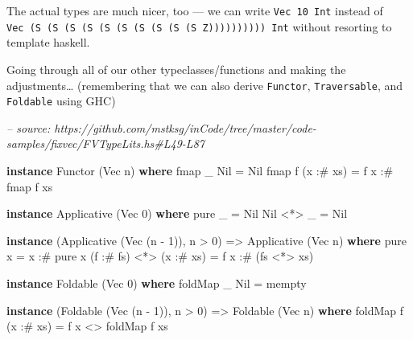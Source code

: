 \documentclass[]{article}
\newenvironment{Shaded}{}{}
\newcommand{\CommentTok}[1]{\textcolor[rgb]{0.38,0.63,0.69}{\textit{#1}}}
\newcommand{\DataTypeTok}[1]{\textcolor[rgb]{0.56,0.13,0.00}{#1}}
\newcommand{\DecValTok}[1]{\textcolor[rgb]{0.25,0.63,0.44}{#1}}
\newcommand{\FunctionTok}[1]{\textcolor[rgb]{0.02,0.16,0.49}{#1}}
\newcommand{\KeywordTok}[1]{\textcolor[rgb]{0.00,0.44,0.13}{\textbf{#1}}}
\newcommand{\NormalTok}[1]{#1}
\newcommand{\OtherTok}[1]{\textcolor[rgb]{0.00,0.44,0.13}{#1}}
\begin{document}
The actual types are much nicer, too --- we can write \texttt{Vec\ 10\ Int}
instead of
\texttt{Vec\ (S\ (S\ (S\ (S\ (S\ (S\ (S\ (S\ (S\ (S\ Z))))))))))\ Int} without
resorting to template haskell.

Going through all of our other typeclasses/functions and making the
adjustments\ldots{} (remembering that we can also derive \texttt{Functor},
\texttt{Traversable}, and \texttt{Foldable} using GHC)

\begin{Shaded}
\begin{Highlighting}[]
\CommentTok{-- source: https://github.com/mstksg/inCode/tree/master/code-samples/fixvec/FVTypeLits.hs#L49-L87}

\KeywordTok{instance} \DataTypeTok{Functor}\NormalTok{ (}\DataTypeTok{Vec}\NormalTok{ n) }\KeywordTok{where}
\NormalTok{    fmap _ }\DataTypeTok{Nil}       \FunctionTok{=} \DataTypeTok{Nil}
\NormalTok{    fmap f (x }\FunctionTok{:#}\NormalTok{ xs) }\FunctionTok{=}\NormalTok{ f x }\FunctionTok{:#}\NormalTok{ fmap f xs}

\KeywordTok{instance} \DataTypeTok{Applicative}\NormalTok{ (}\DataTypeTok{Vec} \DecValTok{0}\NormalTok{) }\KeywordTok{where}
\NormalTok{    pure _    }\FunctionTok{=} \DataTypeTok{Nil}
    \DataTypeTok{Nil} \FunctionTok{<*>}\NormalTok{ _ }\FunctionTok{=} \DataTypeTok{Nil}

\KeywordTok{instance}\NormalTok{ (}\DataTypeTok{Applicative}\NormalTok{ (}\DataTypeTok{Vec}\NormalTok{ (n }\FunctionTok{-} \DecValTok{1}\NormalTok{)), n }\FunctionTok{>} \DecValTok{0}\NormalTok{) }\OtherTok{=>} \DataTypeTok{Applicative}\NormalTok{ (}\DataTypeTok{Vec}\NormalTok{ n) }\KeywordTok{where}
\NormalTok{    pure x }\FunctionTok{=}\NormalTok{ x }\FunctionTok{:#}\NormalTok{ pure x}
\NormalTok{    (f }\FunctionTok{:#}\NormalTok{ fs) }\FunctionTok{<*>}\NormalTok{ (x }\FunctionTok{:#}\NormalTok{ xs) }\FunctionTok{=}\NormalTok{ f x }\FunctionTok{:#}\NormalTok{ (fs }\FunctionTok{<*>}\NormalTok{ xs)}

\KeywordTok{instance} \DataTypeTok{Foldable}\NormalTok{ (}\DataTypeTok{Vec} \DecValTok{0}\NormalTok{) }\KeywordTok{where}
\NormalTok{    foldMap _ }\DataTypeTok{Nil} \FunctionTok{=}\NormalTok{ mempty}

\KeywordTok{instance}\NormalTok{ (}\DataTypeTok{Foldable}\NormalTok{ (}\DataTypeTok{Vec}\NormalTok{ (n }\FunctionTok{-} \DecValTok{1}\NormalTok{)), n }\FunctionTok{>} \DecValTok{0}\NormalTok{) }\OtherTok{=>} \DataTypeTok{Foldable}\NormalTok{ (}\DataTypeTok{Vec}\NormalTok{ n) }\KeywordTok{where}
\NormalTok{    foldMap f (x }\FunctionTok{:#}\NormalTok{ xs) }\FunctionTok{=}\NormalTok{ f x }\FunctionTok{<>}\NormalTok{ foldMap f xs}


\end{Highlighting}
\end{Shaded}
\end{document}
